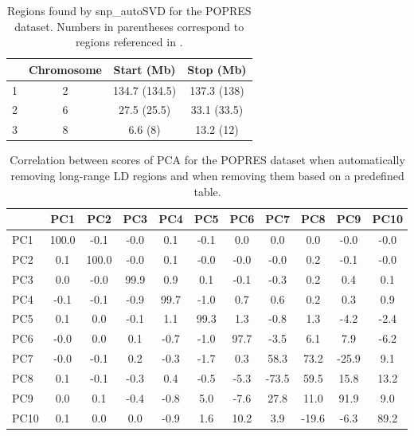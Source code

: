 \documentclass[a4paper, 11pt]{article}
\begin{document}
\begin{table}[htpb]
\centering
\begin{tabular}{lccc}
  \hline
 & Chromosome & Start (Mb) & Stop (Mb) \\ 
  \hline
1 &  2 & 134.7 (134.5) & 137.3 (138) \\ 
  2 &  6 & 27.5 (25.5) & 33.1 (33.5) \\ 
  3 &  8 & 6.6 (8) & 13.2 (12) \\ 
   \hline
\end{tabular}
\caption{Regions found by snp\_autoSVD for the POPRES dataset. Numbers in parentheses correspond to regions referenced in \cite{Price2008}.}
\label{tab:lrldr-popres}
\end{table}

\begin{table}[htpb]
\centering
\begin{tabular}{l|cccccccccc}
  \hline
 & PC1 & PC2 & PC3 & PC4 & PC5 & PC6 & PC7 & PC8 & PC9 & PC10 \\
  \hline
PC1 & 100.0 & -0.1 & -0.0 & 0.1 & -0.1 & 0.0 & 0.0 & 0.0 & -0.0 & -0.0 \\
  PC2 & 0.1 & 100.0 & -0.0 & 0.1 & -0.0 & -0.0 & -0.0 & 0.2 & -0.1 & -0.0 \\
  PC3 & 0.0 & -0.0 & 99.9 & 0.9 & 0.1 & -0.1 & -0.3 & 0.2 & 0.4 & 0.1 \\
  PC4 & -0.1 & -0.1 & -0.9 & 99.7 & -1.0 & 0.7 & 0.6 & 0.2 & 0.3 & 0.9 \\
  PC5 & 0.1 & 0.0 & -0.1 & 1.1 & 99.3 & 1.3 & -0.8 & 1.3 & -4.2 & -2.4 \\
  PC6 & -0.0 & 0.0 & 0.1 & -0.7 & -1.0 & 97.7 & -3.5 & 6.1 & 7.9 & -6.2 \\
  PC7 & -0.0 & -0.1 & 0.2 & -0.3 & -1.7 & 0.3 & 58.3 & 73.2 & -25.9 & 9.1 \\
  PC8 & 0.1 & -0.1 & -0.3 & 0.4 & -0.5 & -5.3 & -73.5 & 59.5 & 15.8 & 13.2 \\
  PC9 & 0.0 & 0.1 & -0.4 & -0.8 & 5.0 & -7.6 & 27.8 & 11.0 & 91.9 & 9.0 \\
  PC10 & 0.1 & 0.0 & 0.0 & -0.9 & 1.6 & 10.2 & 3.9 & -19.6 & -6.3 & 89.2 \\
   \hline
\end{tabular}
\caption{Correlation between scores of PCA for the POPRES dataset  when automatically removing long-range LD regions and when removing them based on a predefined table.}
\label{tab:pc-popres}
\end{table}
\end{document}
